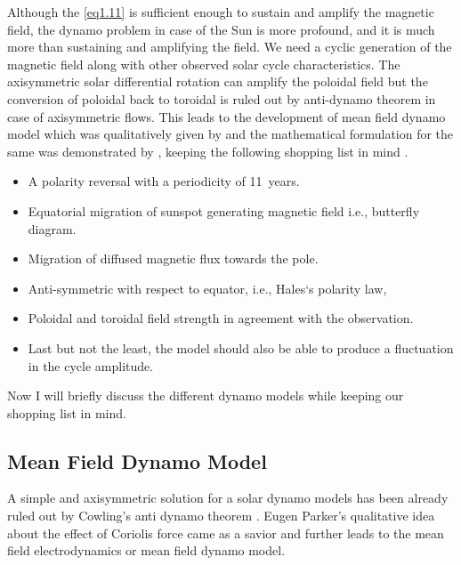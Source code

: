 Although the \autoref{eq1.11} is sufficient enough to sustain and amplify the magnetic field, the dynamo problem in case of the Sun is more profound, and it is much more than sustaining and amplifying the field.  We need a cyclic generation of the magnetic field along with other observed solar cycle characteristics. The axisymmetric solar differential rotation can amplify the poloidal field but the conversion of poloidal back to toroidal is ruled out by anti-dynamo theorem in case of axisymmetric flows. This leads to the development of mean field dynamo model which was qualitatively given by \citet{Parker1955} and the mathematical formulation for the same was demonstrated by \citet{Krause1980}, keeping the following shopping list in mind \citep{Charbonneau2010}.
\begin{itemize}
    \item A polarity reversal with a periodicity of 11~years.
    \item Equatorial migration of sunspot generating magnetic field i.e., butterfly diagram.
    \item Migration of diffused magnetic flux towards the pole.
    \item Anti-symmetric with respect to equator, i.e., Hales`s polarity law,
    \item Poloidal and toroidal field strength in agreement with the observation.
    \item Last but not the least, the model should also be able to produce a fluctuation in the cycle amplitude.
\end{itemize}

Now I will briefly discuss the different dynamo models while  keeping our shopping list in mind.

\subsection{Mean Field Dynamo Model}
A simple and axisymmetric solution for a solar dynamo models has been already ruled out by Cowling's anti dynamo theorem \citep{Cowling1933}. Eugen Parker's qualitative idea about the effect of Coriolis force \citep{Parker1955} came as a savior and further leads to the mean field electrodynamics or mean field dynamo model.



